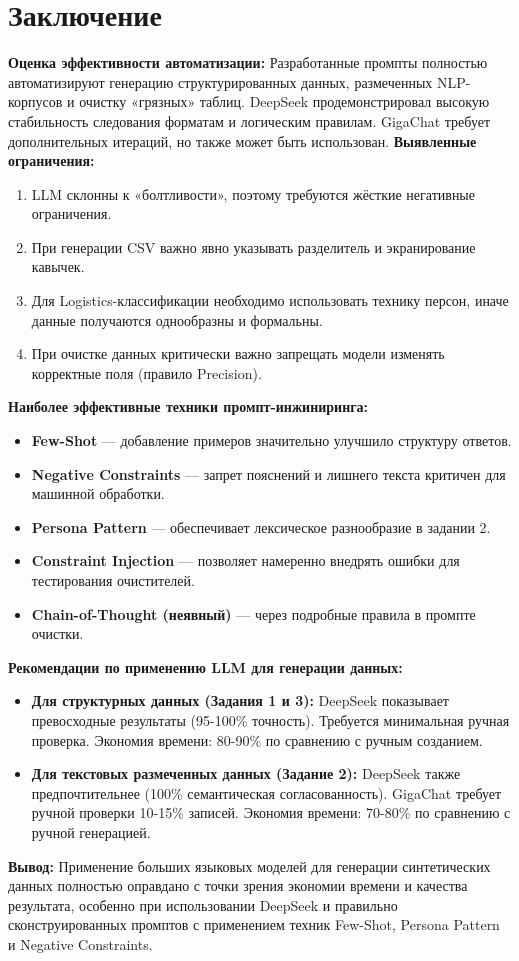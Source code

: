 \documentclass[oneside,a4paper,14pt]{extarticle} %
\begin{document}
	\section*{Заключение}
	\noindent
	\textbf{Оценка эффективности автоматизации:} Разработанные промпты полностью автоматизируют генерацию структурированных данных, размеченных NLP-корпусов и очистку «грязных» таблиц. DeepSeek продемонстрировал высокую стабильность следования форматам и логическим правилам. GigaChat требует дополнительных итераций, но также может быть использован.
	\noindent
	\textbf{Выявленные ограничения:}
	\begin{enumerate}
		\item LLM склонны к «болтливости», поэтому требуются жёсткие негативные ограничения.
		\item При генерации CSV важно явно указывать разделитель и экранирование кавычек.
		\item Для Logistics-классификации необходимо использовать технику персон, иначе данные получаются однообразны и формальны.
		\item При очистке данных критически важно запрещать модели изменять корректные поля (правило Precision).
	\end{enumerate}
	\noindent
	\textbf{Наиболее эффективные техники промпт-инжиниринга:}
	\begin{itemize}
		\item \textbf{Few-Shot} --- добавление примеров значительно улучшило структуру ответов.
		\item \textbf{Negative Constraints} --- запрет пояснений и лишнего текста критичен для машинной обработки.
		\item \textbf{Persona Pattern} --- обеспечивает лексическое разнообразие в задании 2.
		\item \textbf{Constraint Injection} --- позволяет намеренно внедрять ошибки для тестирования очистителей.
		\item \textbf{Chain-of-Thought (неявный)} --- через подробные правила в промпте очистки.
	\end{itemize}
	\noindent
	\textbf{Рекомендации по применению LLM для генерации данных:}
	\begin{itemize}
		\item \textbf{Для структурных данных (Задания 1 и 3):} DeepSeek показывает превосходные результаты (95-100\% точность). Требуется минимальная ручная проверка. Экономия времени: 80-90\% по сравнению с ручным созданием.
		\item \textbf{Для текстовых размеченных данных (Задание 2):} DeepSeek также предпочтительнее (100\% семантическая согласованность). GigaChat требует ручной проверки 10-15\% записей. Экономия времени: 70-80\% по сравнению с ручной генерацией.
	\end{itemize}
	\noindent
	\textbf{Вывод:} Применение больших языковых моделей для генерации синтетических данных полностью оправдано с точки зрения экономии времени и качества результата, особенно при использовании DeepSeek и правильно сконструированных промптов с применением техник Few-Shot, Persona Pattern и Negative Constraints.
\end{document}
